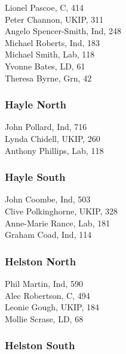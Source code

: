 \documentclass[a4paper,openany,10pt]{book}
\begin{document}


Lionel Pascoe, C, 414\\
Peter Channon, UKIP, 311\\
Angelo Spencer-Smith, Ind, 248\\
Michael Roberts, Ind, 183\\
Michael Smith, Lab, 118\\
Yvonne Bates, LD, 61\\
Theresa Byrne, Grn, 42\\


\subsubsection*{Hayle North}



John Pollard, Ind, 716\\
Lynda Chidell, UKIP, 260\\
Anthony Phillips, Lab, 118\\


\subsubsection*{Hayle South}



John Coombe, Ind, 503\\
Clive Polkinghorne, UKIP, 328\\
Anne-Marie Rance, Lab, 181\\
Graham Coad, Ind, 114\\


\subsubsection*{Helston North}



Phil Martin, Ind, 590\\
Alec Robertson, C, 494\\
Leonie Gough, UKIP, 184\\
Mollie Scrase, LD, 68\\


\subsubsection*{Helston South}
\end{document}
